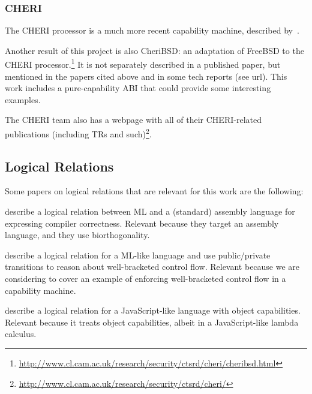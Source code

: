\documentclass{article}
\begin{document}
\subsubsection{CHERI}

The CHERI processor is a much more recent capability machine, described
by~\cite{Woodruff:2014:CCM:2665671.2665740,Watson2015Cheri}.

Another result of this project is also CheriBSD: an adaptation of FreeBSD to the
CHERI
processor.\footnote{\url{http://www.cl.cam.ac.uk/research/security/ctsrd/cheri/cheribsd.html}}
It is not separately described in a published paper, but mentioned in the papers
cited above and in some tech reports (see url). This work includes a
pure-capability ABI that could provide some interesting examples.

The CHERI team also has a webpage with all of their CHERI-related publications
(including TRs and
such)\footnote{\url{http://www.cl.cam.ac.uk/research/security/ctsrd/cheri/}}.

\subsection{Logical Relations}
\label{sec:rw-log-rel}

Some papers on logical relations that are relevant for this work are the
following:

\cite{Hur:2011:KLR:1926385.1926402} describe a logical relation between ML and
a (standard) assembly language for expressing compiler correctness.  Relevant
because they target an assembly language, and they use biorthogonality.

\cite{Dreyer:2010:IHS:1863543.1863566} describe a logical relation for a ML-like
language and use public/private transitions to reason about well-bracketed
control flow. Relevant because we are considering to cover an example of
enforcing well-bracketed control flow in a capability machine.

\cite{Devriese:2016ObjCap} describe a logical relation for a JavaScript-like
language with object capabilities.  Relevant because it treats object
capabilities, albeit in a JavaScript-like lambda calculus.



\end{document}
